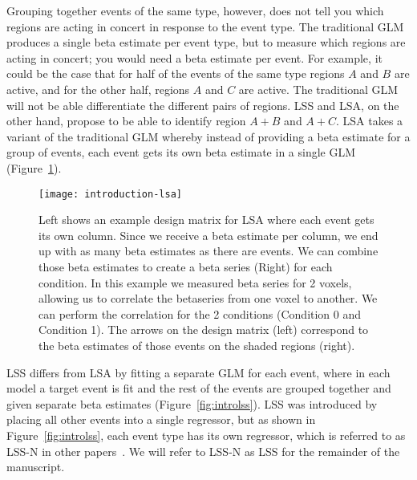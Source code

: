 \documentclass[phd,appendix,figures]{uithesis}
\begin{document}
Grouping together events of the same type, however, does not tell you which regions are acting in concert
in response to the event type.
The traditional GLM produces a single beta estimate per event type, but to measure which regions
are acting in concert; you would need a beta estimate per event.
For example, it could be the case that for half of the events of the same type regions $A$ and $B$ are active,
and for the other half, regions $A$ and $C$ are active.
The traditional GLM will not be able differentiate the different pairs of regions.
LSS and LSA, on the other hand, propose to be able to identify region $A+B$ and $A+C$.
LSA takes a variant of the traditional GLM whereby instead of providing a beta
estimate for a group of events, each event gets its own beta estimate in a single GLM (Figure~\ref{fig:introlsa}).

\begin{figure}[H]
  \centering
  \texttt{[image: introduction-lsa]}
  \caption{
    Left shows an example design matrix for LSA where each event gets its own column.
    Since we receive a beta estimate per column, we end up with as many beta estimates as there
    are events.
    We can combine those beta estimates to create a beta series (Right) for each condition.
    In this example we measured beta series for 2 voxels, allowing us to
    correlate the betaseries from one voxel to another.
    We can perform the correlation for the 2 conditions (Condition 0 and Condition 1).
    The arrows on the design matrix (left) correspond to the beta estimates of those events
    on the shaded regions (right).
  }
  \label{fig:introlsa}
\end{figure}

LSS differs from LSA by fitting a separate GLM for each event, where in each model a target
event is fit and the rest of the events are grouped together and given separate beta estimates (Figure~\ref{fig:introlss}).
LSS was introduced by placing all other events into a single regressor, but as shown in Figure~\ref{fig:introlss},
each event type has its own regressor, which is referred to as LSS-N in other papers~\cite{Rissman2004,Abdulrahman2016,Mumford2012}.
We will refer to LSS-N as LSS for the remainder of the manuscript.
\end{document}
